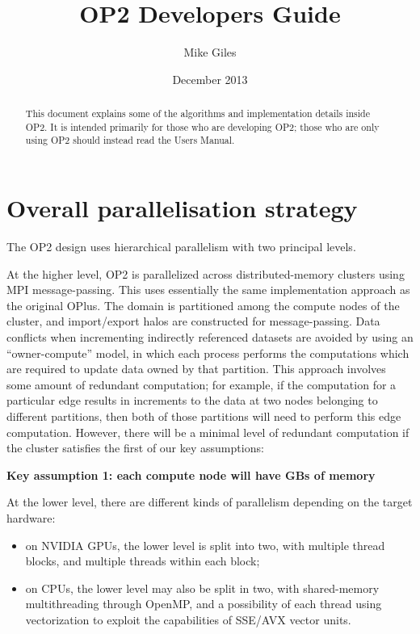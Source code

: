 \documentclass[11pt]{article}
\date{December 2013}
\begin{document}
\title{OP2 Developers Guide}
\author{Mike Giles}

\maketitle

\begin{abstract}
This document explains some of the algorithms and implementation
details inside OP2.  It is intended primarily for those who are
developing OP2; those who are only using OP2 should instead read
the Users Manual.
\vspace*{0.2in}
\end{abstract}

\newpage

\tableofcontents

\newpage

\section{Overall parallelisation strategy}

The OP2 design uses hierarchical parallelism with two principal levels.

At the higher level, OP2 is parallelized across distributed-memory
clusters using MPI message-passing.  This uses essentially the same
implementation approach as the original OPlus.  The domain is
partitioned among the compute nodes of the cluster, and import/export
halos are constructed for message-passing.  Data conflicts when
incrementing indirectly referenced datasets are avoided by using an
``owner-compute'' model, in which each process performs the computations
which are required to update data owned by that partition.  This approach
involves some amount of redundant computation; for example, if the
computation for a particular edge results in increments to the data at
two nodes belonging to different partitions, then both of those partitions
will need to perform this edge computation.  However, there will be a
minimal level of redundant computation if the cluster satisfies the first
of our key assumptions:

\vspace{0.1in}
{\bf Key assumption 1: each compute node will have GBs of memory}
\vspace{0.1in}

At the lower level, there are different kinds of parallelism depending
on the target hardware:
\begin{itemize}
\item
on NVIDIA GPUs, the lower level is split into two, with multiple
thread blocks, and multiple threads within each block;
\item
on CPUs, the lower level may also be split in two, with shared-memory
multithreading through OpenMP, and a possibility of each thread using
vectorization to exploit the capabilities of SSE/AVX vector units.
\end{itemize}
\end{document}
